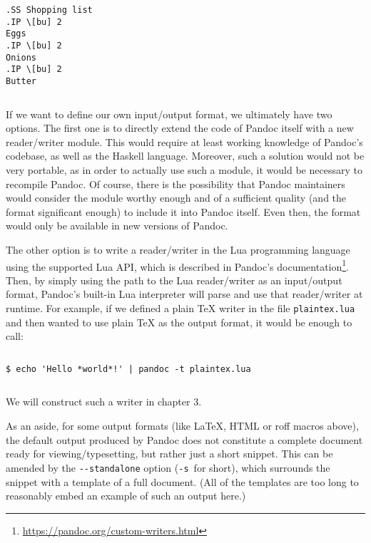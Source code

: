 \documentclass[
  digital,     %
  oneside,     %
  nosansbold,  %
  nocolorbold, %
  lof,         %
  nolot,       %
]{fithesis4}
\begin{document}
$ $

\noindent
\begin{lstlisting}
.SS Shopping list
.IP \[bu] 2
Eggs
.IP \[bu] 2
Onions
.IP \[bu] 2
Butter
\end{lstlisting}

$ $

\noindent
If we want to define our own input/output format, we ultimately have two options. The first one is to directly extend the code of Pandoc itself with a new reader/writer module. This would require at least working knowledge of Pandoc's codebase, as well as the Haskell language. Moreover, such a solution would not be very portable, as in order to actually use such a module, it would be necessary to recompile Pandoc. Of course, there is the possibility that Pandoc maintainers would consider the module worthy enough and of a sufficient quality (and the format significant enough) to include it into Pandoc itself. Even then, the format would only be available in new versions of Pandoc.

The other option is to write a reader/writer in the Lua programming language using the supported Lua API, which is described in Pandoc's documentation\footnote{\url{https://pandoc.org/custom-writers.html}}. Then, by simply using the path to the Lua reader/writer as an input/output format, Pandoc's built-in Lua interpreter will parse and use that reader/writer at runtime. For example, if we defined a plain \TeX{} writer in the file \texttt{plaintex.lua} and then wanted to use plain \TeX{} as the output format, it would be enough to call:

$ $

\noindent
\begin{lstlisting}
$ echo 'Hello *world*!' | pandoc -t plaintex.lua
\end{lstlisting}

$ $

\noindent
We will construct such a writer in chapter 3.

As an aside, for some output formats (like \LaTeX{}, HTML or roff macros above), the default output produced by Pandoc does not constitute a complete document ready for viewing/typesetting, but rather just a short snippet. This can be amended by the \texttt{-{}-standalone} option (\texttt{-s}~for short), which surrounds the snippet with a template of a full document. (All of the templates are too long to reasonably embed an example of such an output here.)
\end{document}
